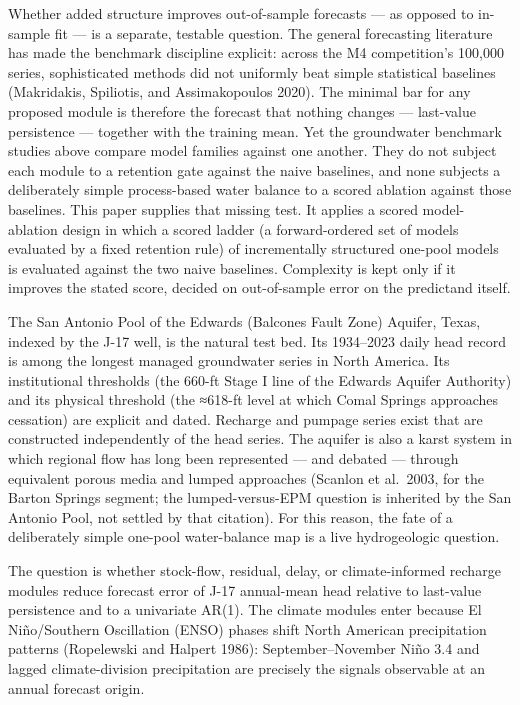 \documentclass[11pt]{article}
\begin{document}
Whether added structure improves out-of-sample forecasts --- as opposed
to in-sample fit --- is a separate, testable question. The general
forecasting literature has made the benchmark discipline explicit:
across the M4 competition's 100,000 series, sophisticated methods did
not uniformly beat simple statistical baselines (Makridakis, Spiliotis,
and Assimakopoulos 2020). The minimal bar for any proposed module is
therefore the forecast that nothing changes --- last-value persistence
--- together with the training mean. Yet the groundwater benchmark
studies above compare model families against one another. They do not
subject each module to a retention gate against the naive baselines, and
none subjects a deliberately simple process-based water balance to a
scored ablation against those baselines. This paper supplies that
missing test. It applies a scored model-ablation design in which a
scored ladder (a forward-ordered set of models evaluated by a fixed
retention rule) of incrementally structured one-pool models is evaluated
against the two naive baselines. Complexity is kept only if it improves
the stated score, decided on out-of-sample error on the predictand
itself.

The San Antonio Pool of the Edwards (Balcones Fault Zone) Aquifer,
Texas, indexed by the J-17 well, is the natural test bed. Its 1934--2023
daily head record is among the longest managed groundwater series in
North America. Its institutional thresholds (the 660-ft Stage I line of
the Edwards Aquifer Authority) and its physical threshold (the ≈618-ft
level at which Comal Springs approaches cessation) are explicit and
dated. Recharge and pumpage series exist that are constructed
independently of the head series. The aquifer is also a karst system in
which regional flow has long been represented --- and debated ---
through equivalent porous media and lumped approaches (Scanlon et
al.~2003, for the Barton Springs segment; the lumped-versus-EPM question
is inherited by the San Antonio Pool, not settled by that citation). For
this reason, the fate of a deliberately simple one-pool water-balance
map is a live hydrogeologic question.

The question is whether stock-flow, residual, delay, or climate-informed
recharge modules reduce forecast error of J-17 annual-mean head relative
to last-value persistence and to a univariate AR(1). The climate modules
enter because El Niño/Southern Oscillation (ENSO) phases shift North
American precipitation patterns (Ropelewski and Halpert 1986):
September--November Niño 3.4 and lagged climate-division precipitation
are precisely the signals observable at an annual forecast origin.
\end{document}
